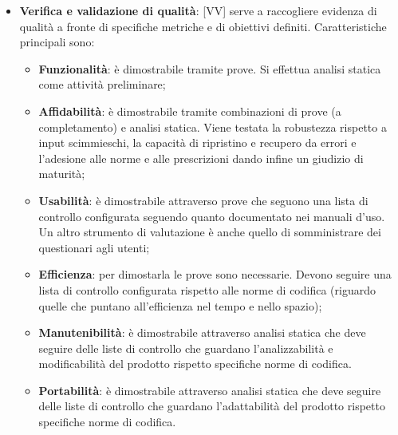 \begin{itemize}
	\item \textbf{Verifica e validazione di qualità}: [VV] serve a raccogliere evidenza di qualità a fronte di specifiche metriche e di obiettivi definiti. Caratteristiche principali sono:
		\begin{itemize}
			\item \textbf{Funzionalità}: è dimostrabile tramite prove. Si effettua analisi statica come attività preliminare;
			\item \textbf{Affidabilità}: è dimostrabile tramite combinazioni di prove (a completamento) e analisi statica. Viene testata la robustezza rispetto a input scimmieschi, la capacità di ripristino e recupero da errori e l'adesione alle norme e alle prescrizioni dando infine un giudizio di maturità;
			\item \textbf{Usabilità}: è dimostrabile attraverso prove che seguono una lista di controllo configurata seguendo quanto documentato nei manuali d'uso. Un altro strumento di valutazione è anche quello di somministrare dei questionari agli utenti;
			\item \textbf{Efficienza}: per dimostarla le prove sono necessarie. Devono seguire una lista di controllo configurata rispetto alle norme di codifica (riguardo quelle che puntano all'efficienza nel tempo e nello spazio);
			\item \textbf{Manutenibilità}: è dimostrabile attraverso analisi statica che deve seguire delle liste di controllo che guardano l'analizzabilità e modificabilità del prodotto rispetto specifiche norme di codifica.
			\item \textbf{Portabilità}: è dimostrabile attraverso analisi statica che deve seguire delle liste di controllo che guardano l'adattabilità del prodotto rispetto specifiche norme di codifica.
		\end{itemize}


\end{itemize}